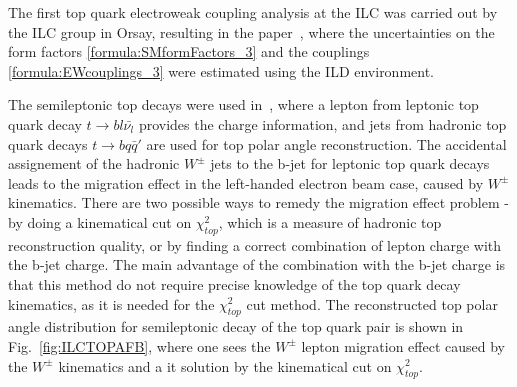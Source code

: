 The first top quark electroweak coupling analysis at the ILC was carried out by the ILC group in Orsay, resulting in the paper~\cite{bib:ILCTOP}, where the uncertainties on the form factors \ref{formula:SMformFactors_3} and the couplings \ref{formula:EWcouplings_3} were estimated using the ILD environment.


The semileptonic top decays were used in~\cite{bib:ILCTOP}, where  a lepton from leptonic top quark decay $t\to b l \bar{\nu_l}$ provides the charge information, and jets from hadronic top quark decays $t \to b q \bar{q}'$ are used for top polar angle reconstruction. 
The accidental assignement of the hadronic $W^\pm$ jets to the b-jet for leptonic  top quark decays leads to the migration effect in the left-handed electron beam case, caused by $W^\pm$ kinematics. 
There are two possible ways to remedy the migration effect problem - by doing a kinematical cut on $\chi^2_{top}$, which is a measure of hadronic top reconstruction quality, or by finding a correct combination of lepton charge with the b-jet charge. 
The main advantage of the combination with the b-jet charge is that this method do not require precise knowledge of the top quark decay kinematics, as it is needed for the $\chi^2_{top}$ cut method. The reconstructed top polar angle distribution for semileptonic decay of the top quark pair is shown in Fig.~\ref{fig:ILCTOPAFB}, where one sees the $W^\pm$ lepton migration effect caused by the $W^\pm$ kinematics and a it solution by the kinematical cut on $\chi^2_{top}$.


